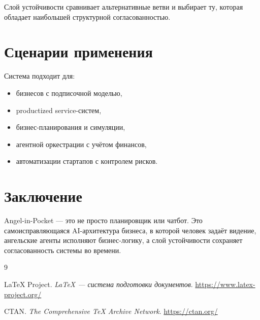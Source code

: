 \documentclass[11pt,a4paper]{article}
\begin{document}
Слой устойчивости сравнивает альтернативные ветви и выбирает ту, которая обладает наибольшей структурной согласованностью.

\section{Сценарии применения}

Система подходит для:

\begin{itemize}[leftmargin=1.2cm]
    \item бизнесов с подписочной моделью,
    \item productized service-систем,
    \item бизнес-планирования и симуляции,
    \item агентной оркестрации с учётом финансов,
    \item автоматизации стартапов с контролем рисков.
\end{itemize}

\section{Заключение}

Angel-in-Pocket — это не просто планировщик или чатбот. Это самоисправляющаяся AI-архитектура бизнеса, в которой человек задаёт видение, ангельские агенты исполняют бизнес-логику, а слой устойчивости сохраняет согласованность системы во времени.

\begin{thebibliography}{9}

LaTeX Project. \emph{LaTeX — система подготовки документов}. \url{https://www.latex-project.org/}

CTAN. \emph{The Comprehensive TeX Archive Network}. \url{https://ctan.org/}

\end{thebibliography}
\end{document}
